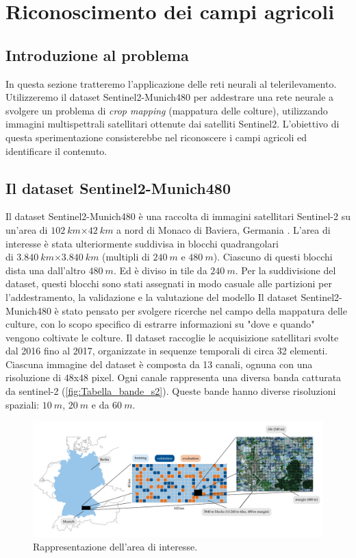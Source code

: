 \section{Riconoscimento dei campi agricoli}
\subsection{Introduzione al problema}
In questa sezione tratteremo l'applicazione delle reti neurali al telerilevamento. 
Utilizzeremo il dataset Sentinel2-Munich480 \cite{Munich480} per addestrare una 
rete neurale a svolgere un problema di \textit{crop mapping} (mappatura delle colture),  
utilizzando immagini multispettrali satellitari ottenute dai satelliti Sentinel2.
L'obiettivo di questa sperimentazione consisterebbe nel riconoscere i campi agricoli ed 
identificare il contenuto.

\subsection{Il dataset Sentinel2-Munich480}
Il dataset Sentinel2-Munich480 è una raccolta di immagini 
satellitari Sentinel-2 su un'area di $102\ km$×$42\ km$ a nord di Monaco di 
Baviera, Germania \cite{Munich480,Monaco}. 
L'area di interesse è stata ulteriormente suddivisa in blocchi quadrangolari \\
di $3.840\ km$×$3.840\ km$ (multipli di $240\ m$ e $480\ m$).
Ciascuno di questi blocchi dista una dall'altro $480\ m$. Ed è diviso in tile da $240\ m$.
Per la suddivisione del dataset, questi blocchi sono stati assegnati in 
modo casuale alle partizioni per l'addestramento, la validazione e la valutazione 
del modello
Il dataset Sentinel2-Munich480 è stato pensato per svolgere ricerche nel campo 
della mappatura delle culture, con lo 
scopo specifico di estrarre informazioni su "dove e quando" vengono coltivate 
le colture.
Il dataset raccoglie le acquisizione satellitari svolte dal 2016 fino 
al 2017, organizzate in sequenze temporali di circa 32 elementi.
Ciascuna immagine del dataset è composta da 13 canali, ognuna con una risoluzione 
di $48$x$48$ pixel. 
Ogni canale rappresenta una diversa banda catturata da sentinel-2 (\ref{fig:Tabella_bande_s2}). 
Queste bande hanno diverse risoluzioni spaziali: $10\ m$, $20\ m$ e da $60\ m$.

\begin{center}
    \begin{figure}[H]
        \centering
        \includegraphics[width=1.0\textwidth]{Immagini/sperimentazione/Munich.png}
        \caption{Rappresentazione dell'area di interesse.}
        \label{fig:MUNICH}
    \end{figure} 
\end{center}


